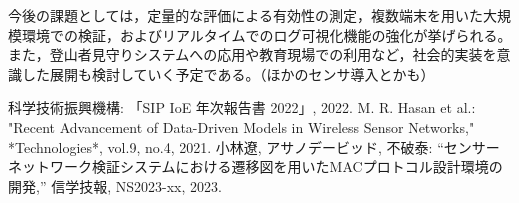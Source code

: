 \documentclass[paper]{ieicej}
\begin{document}
今後の課題としては，定量的な評価による有効性の測定，複数端末を用いた大規模環境での検証，およびリアルタイムでのログ可視化機能の強化が挙げられる。また，登山者見守りシステムへの応用や教育現場での利用など，社会的実装を意識した展開も検討していく予定である。（ほかのセンサ導入とかも）


\baselineskip
%
%

\begin{thebibliography}{99}
 科学技術振興機構: 「SIP IoE 年次報告書 2022」, 2022.
 M. R. Hasan et al.: "Recent Advancement of Data-Driven Models in Wireless Sensor Networks," *Technologies*, vol.9, no.4, 2021.
 小林遼, アサノデービッド, 不破泰:
“センサーネットワーク検証システムにおける遷移図を用いたMACプロトコル設計環境の開発,”
信学技報, NS2023-xx, 2023.

\end{thebibliography}

\appendix
\section{}
\end{document}
